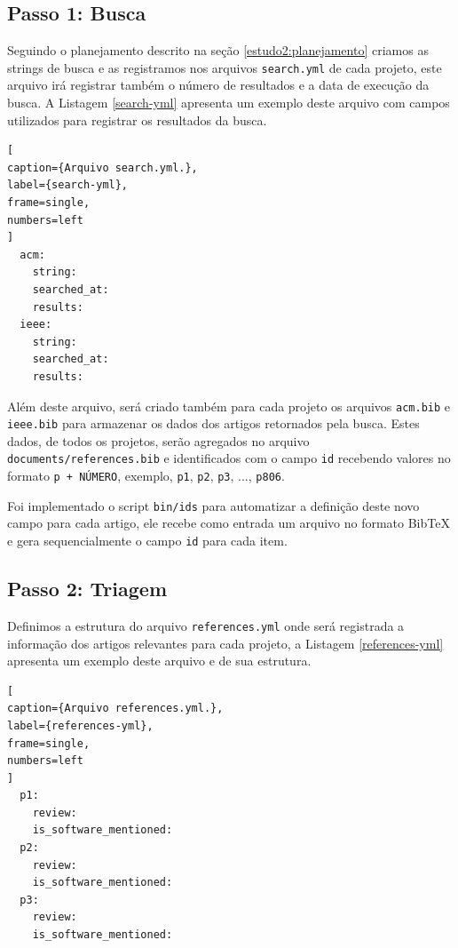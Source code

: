 
\subsection{Passo 1: Busca}

Seguindo o planejamento descrito na seção \ref{estudo2:planejamento} criamos as
strings de busca e as registramos nos arquivos \texttt{search.yml} de cada
projeto, este arquivo irá registrar também o número de resultados e a data de
execução da busca. A Listagem \ref{search-yml} apresenta um exemplo deste
arquivo com campos utilizados para registrar os resultados da busca.

\begin{lstlisting}[
caption={Arquivo search.yml.},
label={search-yml},
frame=single,
numbers=left
]
  acm:
    string:
    searched_at:
    results:
  ieee:
    string:
    searched_at:
    results:
\end{lstlisting}

Além deste arquivo, será criado também para cada projeto os arquivos
\texttt{acm.bib} e \texttt{ieee.bib} para armazenar os dados dos artigos
retornados pela busca. Estes dados, de todos os projetos, serão agregados no
arquivo \texttt{documents/references.bib} e identificados com
o campo \texttt{id} recebendo valores no formato \texttt{p + NÚMERO},
exemplo, \texttt{p1}, \texttt{p2}, \texttt{p3}, ..., \texttt{p806}.

Foi implementado o script \texttt{bin/ids} para automatizar a
definição deste novo campo para cada artigo, ele recebe como entrada um arquivo
no formato BibTeX e gera sequencialmente o campo \texttt{id} para cada item.

\subsection{Passo 2: Triagem}

Definimos a estrutura do arquivo \texttt{references.yml} onde será registrada a
informação dos artigos relevantes para cada projeto, a Listagem
\ref{references-yml} apresenta um exemplo deste arquivo e de sua estrutura.

\begin{lstlisting}[
caption={Arquivo references.yml.},
label={references-yml},
frame=single,
numbers=left
]
  p1:
    review:
    is_software_mentioned:
  p2:
    review:
    is_software_mentioned:
  p3:
    review:
    is_software_mentioned:
\end{lstlisting}

